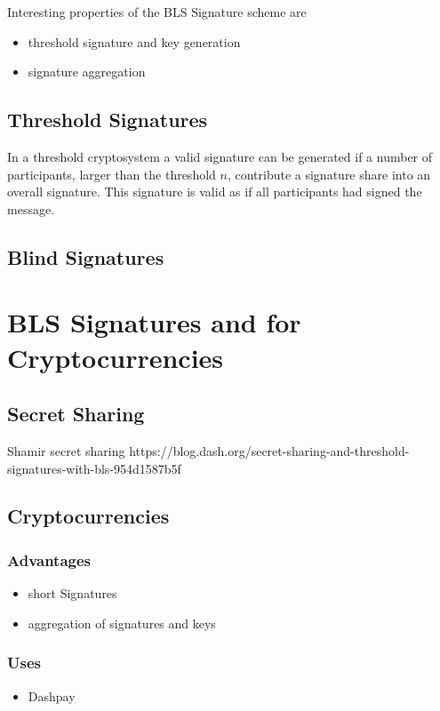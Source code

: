 \documentclass[a4paper,12pt]{scrartcl}
\begin{document}
Interesting properties of the BLS Signature scheme are
\begin{itemize}
	\item threshold signature and key generation
	\item signature aggregation
\end{itemize}

\subsection{Threshold Signatures}

In a threshold cryptosystem a valid signature can be generated if a number of participants, larger than the threshold $n$, contribute a signature share into an overall signature. This signature is valid as if all participants had signed the message.

\subsection{Blind Signatures}

\pagebreak

\section{BLS Signatures and for Cryptocurrencies}
\subsection{Secret Sharing}
Shamir secret sharing https://blog.dash.org/secret-sharing-and-threshold-signatures-with-bls-954d1587b5f
\subsection{Cryptocurrencies}
\subsubsection{Advantages}
\begin{itemize}
	\item short Signatures
	\item aggregation of signatures and keys
\end{itemize}

\subsubsection{Uses}
\begin{itemize}
	\item Dashpay
\end{itemize}
\end{document}
